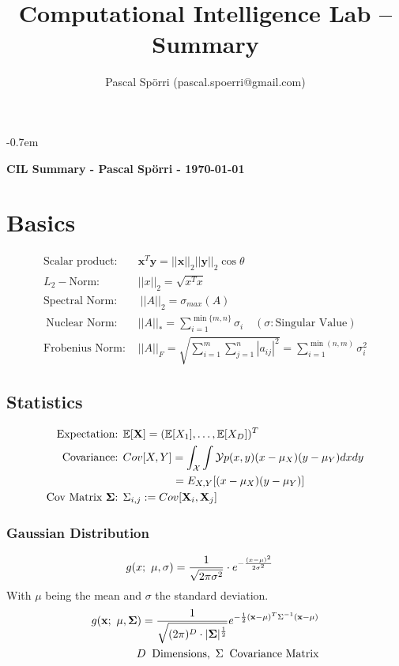 \documentclass[a4paper,11pt,landscape]{article}
\title{Computational Intelligence Lab -- Summary}
\author{Pascal Spörri (pascal.spoerri@gmail.com)}
\newcommand{\sectionline}{\noindent\makebox[\linewidth]{\rule{\columnwidth}{0.1pt}}}
\begin{document}
\raggedright
\footnotesize
\setlength{\columnseprule}{0.1mm}
\abovedisplayskip=0pt
\belowdisplayskip=0cm
\allowdisplaybreaks
\itemsep-0.7em
 
\begin{multicols}{3}
\textbf{CIL Summary - Pascal Spörri - \today}
\vspace{-2mm}
\sectionline
\section{Basics}
\begin{align*}
 \text{Scalar product: }&\mathbf x^T \mathbf y = ||\mathbf x||_2 ||\mathbf y||_2 \cos \theta\\
 L_2-\text{Norm: } & ||x||_2 = \sqrt{x^Tx}\\
 \text{Spectral Norm: } &\ ||A||_2 = \sigma_{max}(A)\\\
 \text{Nuclear Norm: }& ||A||_* = \sum_{i=1}^{\min\{m,n\}} \sigma_i\quad (\sigma: \text{Singular Value})\\
 \text{Frobenius Norm: }& ||A||_F = \sqrt{\sum_{i=1}^m \sum_{j=1}^n |a_{ij}|^2} = \sum_{i=1}^{\min(n,m)} \sigma_i^2
\end{align*}

\vspace{-3mm}
\subsection{Statistics}
\begin{align*}
 \text{Expectation: }&\mathbb E[\mathbf X] = (\mathbb E[X_1], \ldots, \mathbb E[X_D])^T\\
 \text{Covariance: } &Cov[X,Y] = \int_{\mathcal X}\int{\mathcal Y} p(x,y)(x - \mu_X)(y - \mu_Y) dxdy\\
 &\qquad \qquad \, \ = \mathbb \mathcal E_{X,Y}[(x-\mu_X)(y-\mu_Y)]\\
 \text{Cov Matrix $\mathbf \Sigma$: } & \Sigma_{i,j} := Cov[\mathbf X_i, \mathbf X_j]
\end{align*}

\subsubsection{Gaussian Distribution}
\vspace{-2mm}
\begin{align*}
 g(x;\ \mu,\sigma) &= {1\over \sqrt{2\pi \sigma^2}} \cdot e^{- {(x-\mu)^2 \over 2 \sigma^2}}
\end{align*}
With $\mu$ being the mean and $\sigma$ the standard deviation.
\begin{align*}
 g(\mathbf x;\ \mathbf \mu, \mathbf \Sigma) = {1\over \sqrt{(2\pi)^D \cdot |\mathbf \Sigma|^{1\over 2}}} e^{-\frac{1}{2} (\mathbf x - \mathbf \mu)^T  \Sigma^{-1}  (\mathbf x - \mathbf \mu)}\\
 D\:\ \text{Dimensions},\ \Sigma\:\ \text{Covariance Matrix}
\end{align*}

\end{multicols}
\end{document}
